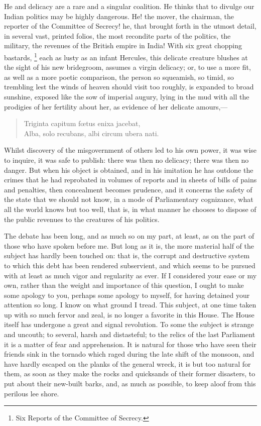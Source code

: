 He and delicacy are a rare and a singular coalition. He thinks that to divulge our Indian politics may be highly dangerous. He! the mover, the chairman, the reporter of the Committee of Secrecy! he, that brought forth in the utmost detail, in several vast, printed folios, the most recondite parts of the politics, the military, the revenues of the British empire in India! With six great chopping bastards,
\footnote{ Six Reports of the Committee of Secrecy.}
 each as lusty as an infant Hercules, this delicate creature blushes at the sight of his new bridegroom, assumes a virgin delicacy; or, to use a more fit, as well as a more poetic comparison, the person so squeamish, so timid, so trembling lest the winds of heaven should visit too roughly, is expanded to broad sunshine, exposed like the sow of imperial augury, lying in the mud with all the prodigies of her fertility about her, as evidence of her delicate amours,—

\begin{verse}
Triginta capitum fœtus enixa jacebat,\\
Alba, solo recubans, albi circum ubera nati.
\end{verse}

Whilst discovery of the misgovernment of others led to his own power, it was wise to inquire, it was safe to publish: there was then no delicacy; there was then no danger. But when his object is obtained, and in his imitation he has outdone the crimes that he had reprobated in volumes of reports and in sheets of bills of pains and penalties, then concealment becomes prudence, and it concerns the safety of the state that we should not know, in a mode of Parliamentary cognizance, what all the world knows but too well, that is, in what manner he chooses to dispose of the public revenues to the creatures of his politics.

The debate has been long, and as much so on my part, at least, as on the part of those who have spoken before me. But long as it is, the more material half of the subject has hardly been touched on: that is, the corrupt and destructive system to which this debt has been rendered subservient, and which seems to be pursued with at least as much vigor and regularity as ever. If I considered your ease or my own, rather than the weight and importance of this question, I ought to make some apology to you, perhaps some apology to myself, for having detained your attention so long. I know on what ground I tread. This subject, at one time taken up with so much fervor and zeal, is no longer a favorite in this House. The House itself has undergone a great and signal revolution. To some the subject is strange and uncouth; to several, harsh and distasteful; to the relics of the last Parliament it is a matter of fear and apprehension. It is natural for those who have seen their friends sink in the tornado which raged during the late shift of the monsoon, and have hardly escaped on the planks of the general wreck, it is but too natural for them, as soon as they make the rocks and quicksands of their former disasters, to put about their new-built barks, and, as much as possible, to keep aloof from this perilous lee shore.

